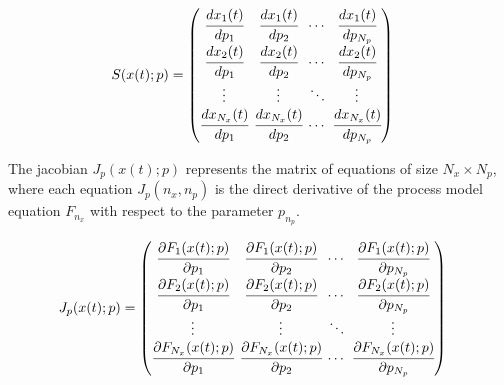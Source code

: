 \documentclass[../Article_Model_Parameters.tex]{subfiles}
\begin{document}
	{\footnotesize
		\begin{equation}
			\begin{split}
				{S}({x}(t);{p}) & = 
				\begingroup %
				\setlength\arraycolsep{2pt}
				\begin{pmatrix}
					\cfrac{d {x_{1}}(t)}{d {p_{1}}} 	& \cfrac{d {x_{1}}(t)}{d {p_{2}}}     & \cdots & \cfrac{d {x_{1}}(t)}{d {p_{N_p}}}\\
					\cfrac{d {x_{2}}(t)}{d {p_{1}}} 	& \cfrac{d {x_{2}}(t)}{d {p_{2}}}     & \cdots & \cfrac{d {x_{2}}(t)}{d {p_{N_p}}}\\
					\vdots					 	    & \vdots 					   	  & \ddots & \vdots\\
					\cfrac{d {x_{N_x}}(t)}{d {p_{1}}} 	& \cfrac{d {x_{N_x}}(t)}{d {p_{2}}}     & \cdots & \cfrac{d {x_{N_x}}(t)}{d {p_{N_p}}}
				\end{pmatrix} 
				\endgroup
			\end{split}
	\end{equation} }
	
	The jacobian ${J_p}({x}(t);{p})$ represents the matrix of equations of size $N_x \times N_p$, where each equation ${J_p}(n_x,n_p)$ is the direct derivative of the process model equation $F_{n_x}$ with respect to the parameter $p_{n_p}$.
	
	{\footnotesize
		\begin{align}
			{J_p}({x}(t);{p}) & =
			\begingroup %
			\setlength\arraycolsep{2pt}
			\begin{pmatrix}
				\cfrac{\partial {F_{1}}({x}(t);{p})}{\partial {p_{1}}} & \cfrac{\partial {F_{1}}({x}(t);{p})}{\partial {p_{2}}} & \cdots & \cfrac{\partial {F_{1}}({x}(t);{p})}{\partial {p_{N_p}}}\\
				\cfrac{\partial {F_{2}}({x}(t);{p})}{\partial {p_{1}}} & \cfrac{\partial {F_{2}}({x}(t);{p})}{\partial {p_{2}}} & \cdots & \cfrac{\partial {F_{2}}({x}(t);{p})}{\partial {p_{N_p}}}\\
				\vdots & \vdots & \ddots & \vdots\\
				\cfrac{\partial {F_{N_x}}({x}(t);{p})}{\partial {p_{1}}} & \cfrac{\partial {F_{N_x}}({x}(t);{p})}{\partial {p_{2}}} & \cdots & \cfrac{\partial {F_{N_x}}({x}(t);{p})}{\partial {p_{N_p}}}
			\end{pmatrix}
			\endgroup
	\end{align}}
	
\end{document}
